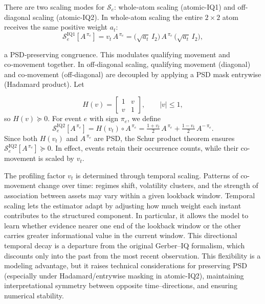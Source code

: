 \documentclass[12pt,letterpaper]{article}
\begin{document}
There are two scaling modes for $\mathcal{S}_e$: whole‑atom scaling (atomic-IQ1) and off-diagonal scaling (atomic-IQ2). In whole-atom scaling the entire $2\times2$ atom receives the same positive weight $a_t$:
\begin{equation}
\mathcal{S}_e^{\mathrm{IQ1}}\!\left[A^{\,\pi_e}\right]
= v_t\,A^{\,\pi_e}
= \big(\sqrt{a_t}\,I_2\big)\,A^{\,\pi_e}\,\big(\sqrt{a_t}\,I_2\big),
\label{eq:IQ1}
\end{equation}

a PSD‑preserving congruence. This modulates qualifying movement and co‑movement together. In off‑diagonal scaling, qualifying movement (diagonal) and co‑movement (off‑diagonal) are decoupled by applying a PSD mask entrywise (Hadamard product). Let

\begin{equation}
H(v)=
\begin{bmatrix}
1 & v\\[2pt]
v & 1
\end{bmatrix},\qquad |v|\le 1,
\label{eq:H-mask}
\end{equation}
so $H(v)\succeq 0$. For event $e$ with sign $\pi_e$, we define
\begin{equation}
\mathcal{S}_e^{\mathrm{IQ2}}\!\left[A^{\,\pi_e}\right]
= H(v_t)\circ A^{\,\pi_e}
= \tfrac{1+v_t}{2}\,A^{\,\pi_e}+\tfrac{1-v_t}{2}\,A^{-\,\pi_e}.
\label{eq:IQ2}
\end{equation}
Since both $H(v_t)$ and $A^{\,\pi_e}$ are PSD, the Schur product theorem ensures $\mathcal{S}_e^{\mathrm{IQ2}}\!\left[A^{\,\pi_e}\right]\succeq 0$. In effect, events retain their occurrence counts, while their co-movement is scaled by $v_t$. 

The profiling factor $v_t$ is determined through temporal scaling. Patterns of co-movement change over time: regimes shift, volatility clusters, and the strength of association between assets may vary within a given lookback window. Temporal scaling lets the estimator adapt by adjusting how much weight each instant contributes to the structured component. In particular, it allows the model to learn whether evidence nearer one end of the lookback window or the other carries greater informational value in the current window. This directional temporal decay is a departure from the original Gerber--IQ formalism, which discounts only into the past from the most recent observation. This flexibility is a modeling advantage, but it raises technical considerations for preserving PSD (especially under Hadamard/entrywise masking in atomic-IQ2), maintaining interpretational symmetry between opposite time--directions, and ensuring numerical stability.
\end{document}

